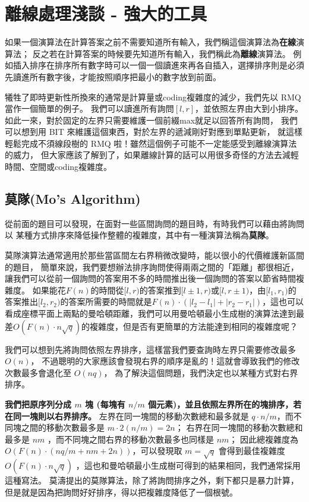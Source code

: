 \documentclass[main.tex]{subfiles}
\begin{document}
\chapter{離線處理淺談 - 強大的工具}
如果一個演算法在計算答案之前不需要知道所有輸入，我們稱這個演算法為\textbf{在線}演算法；
反之若在計算答案的時候要先知道所有輸入，我們稱此為\textbf{離線}演算法。
例如插入排序在排序所有數字時可以一個一個讀進來再各自插入，選擇排序則是必須先讀進所有數字後，才能按照順序把最小的數字放到前面。


犧牲了即時更新性所換來的通常是計算量或coding複雜度的減少，我們先以 RMQ 當作一個簡單的例子。
我們可以讀進所有詢問$[l,r]$，並依照左界由大到小排序。
如此一來，對於固定的左界只需要維護一個前綴max就足以回答所有詢問，
我們可以想到用 BIT 來維護這個東西，對於左界的遞減剛好對應到單點更新，
就這樣輕鬆完成不須線段樹的 RMQ 啦！雖然這個例子可能不一定能感受到離線演算法的威力，
但大家應該了解到了，如果離線計算的話可以用很多奇怪的方法去減輕時間、空間或coding複雜度。

\section{莫隊(Mo's Algorithm)}
從前面的題目可以發現，在面對一些區間詢問的題目時，有時我們可以藉由將詢問以
某種方式排序來降低操作整體的複雜度，其中有一種演算法稱為\textbf{莫隊}。

莫隊演算法通常適用於那些當區間左右界稍微改變時，能以很小的代價維護新區間的題目，
簡單來說，我們要想辦法排序詢問使得兩兩之間的「距離」都很相近，讓我們可以從前一個詢問的答案用不多的時間推出後一個詢問的答案以節省時間複雜度。
如果能花$F(n)$的時間從$[l,r)$的答案推到$[l\pm 1,r)$或$[l,r\pm 1)$，由$[l_1,r_1)$的答案推出$[l_2,r_2)$的答案所需要的時間就是$F(n)\cdot(|l_2-l_1|+|r_2-r_1|)$，這也可以看成座標平面上兩點的曼哈頓距離，我們可以用曼哈頓最小生成樹的演算法達到最差$O(F(n)\cdot n\sqrt{q})$的複雜度，但是否有更簡單的方法能達到相同的複雜度呢？

我們可以想到先將詢問依照左界排序，這樣當我們要查詢時左界只需要修改最多 $O(n)$，
不過聰明的大家應該會發現右界的順序是亂的！這就會導致我們的修改次數最多會退化至 $O(nq)$，
為了解決這個問題，我們決定也以某種方式對右界排序。

\textbf{我們把原序列分成 $m$ 塊 (每塊有 $n/m$ 個元素)，並且依照左界所在的塊排序，若在同一塊則以右界排序。}
左界在同一塊間的移動次數總和最多就是 $q\cdot n/m$，而不同塊之間的移動次數最多是 $m\cdot 2(n/m) = 2n$；
右界在同一塊間的移動次數總和最多是 $nm$ ，而不同塊之間右界的移動次數最多也同樣是 $nm$；
因此總複雜度為 $O(F(n)\cdot (nq/m+nm+2n))$，可以發現取 $m=\sqrt{q}$ 會得到最佳複雜度 $O(F(n)\cdot n\sqrt{q})$ ，這也和曼哈頓最小生成樹可得到的結果相同，我們通常採用這種寫法。
莫濤提出的莫隊算法，除了將詢問排序之外，剩下都只是暴力計算，但是就是因為把詢問好好排序，得以把複雜度降低了一個根號。
\end{document}
